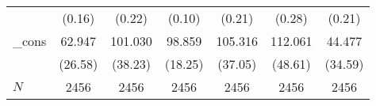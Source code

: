 {\begin{tabular}{l*{6}{c}}
            &                   (0.16)         &                   (0.22)         &                   (0.10)         &                   (0.21)         &                   (0.28)         &                   (0.21)         \\
\_cons      &                   62.947\sym{*}  &                  101.030\sym{**} &                   98.859\sym{***}&                  105.316\sym{**} &                  112.061\sym{*}  &                   44.477         \\
            &                  (26.58)         &                  (38.23)         &                  (18.25)         &                  (37.05)         &                  (48.61)         &                  (34.59)         \\
\hline
\(N\)       &                     2456         &                     2456         &                     2456         &                     2456         &                     2456         &                     2456         \\
\hline\hline
\end{tabular}
}
